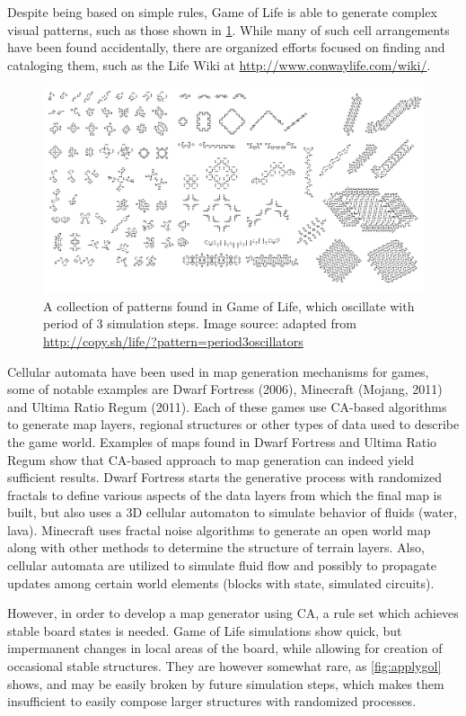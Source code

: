 \documentclass[12pt]{report}
\begin{document}
Despite being based on simple rules, Game of Life is able to generate complex visual patterns, such as those shown in \cref{fig:p3oscillators}. While many of such cell arrangements have been found accidentally, there are organized efforts focused on finding and cataloging them, such as the Life Wiki at \url{http://www.conwaylife.com/wiki/}. 

\begin{figure}[H]
	\centering
	\includegraphics[width=0.9\linewidth]{images/p3oscillators}
	\caption{A collection of patterns found in Game of Life, which oscillate with period of 3 simulation steps. Image source: adapted from \url{http://copy.sh/life/?pattern=period3oscillators}}
	\label{fig:p3oscillators}
\end{figure}

Cellular automata have been used in map generation mechanisms for games, some of notable examples are Dwarf Fortress (2006),  Minecraft (Mojang, 2011) and Ultima Ratio Regum (2011). Each of these games use CA-based algorithms to generate map layers, regional structures or other types of data used to describe the game world. Examples of maps found in Dwarf Fortress and Ultima Ratio Regum show that CA-based approach to map generation can indeed yield sufficient results. Dwarf Fortress starts the generative process with randomized fractals \autocite{adams2015simulation} to define various aspects of the data layers from which the final map is built, but also uses a 3D cellular automaton to simulate behavior of fluids (water, lava). Minecraft uses fractal noise algorithms to generate an open world map along with other methods to determine the structure of terrain layers. Also, cellular automata are utilized to simulate fluid flow and possibly to propagate updates among certain world elements (blocks with state, simulated circuits).

However, in order to develop a map generator using CA, a rule set which achieves stable board states is needed. Game of Life simulations show quick, but impermanent changes in local areas of the board, while allowing for creation of occasional stable structures. They are however somewhat rare, as \ref{fig:applygol} shows, and may be easily broken by future simulation steps, which makes them insufficient to easily compose larger structures with randomized processes.
\end{document}
